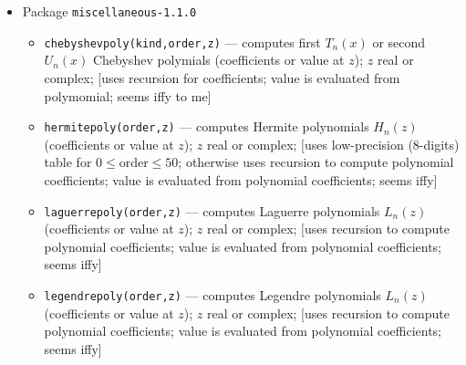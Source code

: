 \documentclass[10pt,dvipdfmx,letterpaper,twoside]{article}
\let\O=\operatorname
\let\Gam=\Gamma
\begin{document}
\begin{itemize}
\begin{itemize}
      [uses series around $-1/e$ and asymptotic expansion at $0$ and $\infty$ to get initial guess, then
      Halley iteration to refine]
  \item {\tt psi(x)} --- computes $\tfrac{d}{dx}\ln\Gam(x)$; real $x$;
      [does simple finite centered difference approximation]
  \item {\tt expint(z)=expint\_E1(z), } --- computes exponential integral $\int_x^\infty e^{t}/t\,dt$; $z$ real or complex;
      [uses {\tt expint\_Ei(-z)+C}]
  \item {\tt expint\_Ei(z)} --- computes exponential integral $-\int_{-x}^\infty e^{t}/t\,dt$; $z$ real or complex;
      [uses quadrature for real $z>2$ or $z<0$; if $|z|\geq10$, $\Im z\leq0$ uses asympotic expansion (with conjugation for $\Im z>0$);
      otherwise uses series expansion]
  \item {\tt erfcinv(z)} --- inverse complementary error function; $z$ real or complex;
      [simply returns {\tt erfinv(1-x)} --- which will have precision issues for $x\sim1$]
  \item {\tt [y,p] = laguerre(z,n)} --- computes the Laguerre polynomial of order $n$ at $z$; $z$ real or complex, $n>0$ integer;
      [computes polynomial coefficients via recursion and then evaluates resulting polynomial at $z$;
      sounds iffy to me...]
  \item {\tt [k,e] = ellipke(m)} --- returns complete elliptic integrals of first $\O{K}(m)$ and second $\O{E}(m)$ kind; real $m\leq1$;
      [uses AGM algorithm and a transform for $m<0$]
  \end{itemize}
\item Package {\tt miscellaneous-1.1.0}
  \begin{itemize}
  \item {\tt chebyshevpoly(kind,order,z)} --- computes first $T_n(x)$ or second $U_n(x)$ Chebyshev polymials
      (coefficients or value at $z$); $z$ real or complex;
      [uses recursion for coefficients; value is evaluated from polymomial; seems iffy to me]
  \item {\tt hermitepoly(order,z)} --- computes Hermite polynomials $H_n(z)$ (coefficients or value at $z$); $z$ real or complex;
      [uses low-precision (8-digits) table for $0\leq\text{order}\leq50$; otherwise uses recursion to compute polynomial
      coefficients; value is evaluated from polynomial coefficients; seems iffy]
  \item {\tt laguerrepoly(order,z)} --- computes Laguerre polynomials $L_n(z)$ (coefficients or value at $z$); $z$ real or complex;
      [uses recursion to compute polynomial coefficients; value is evaluated from polynomial coefficients; seems iffy]
  \item {\tt legendrepoly(order,z)} --- computes Legendre polynomials $L_n(z)$ (coefficients or value at $z$); $z$ real or complex;
      [uses recursion to compute polynomial coefficients; value is evaluated from polynomial coefficients; seems iffy]
  \end{itemize}
\end{itemize}
\end{document}
